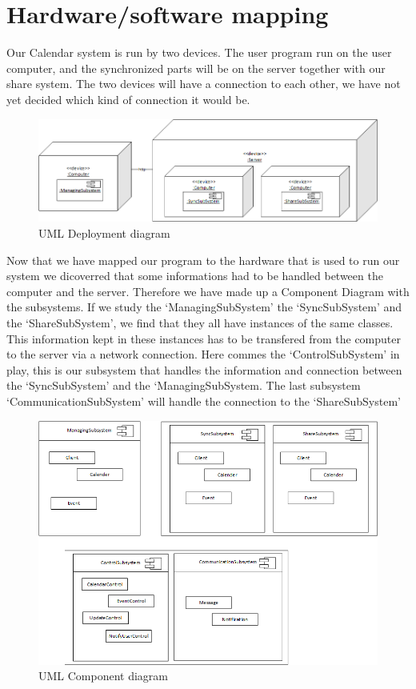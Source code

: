\newpage
\section*{Hardware/software mapping}

Our Calendar system is run by two devices. The user program run on the user computer, and the synchronized parts will be on the server together with our share system. The two devices will have a connection to each other, we have not yet decided which kind of connection it would be.

\begin{figure}[ht!]
\centering
\includegraphics[width=160mm]{UMLDeployment.png}
\caption{UML Deployment diagram \label{overflow}}
\end{figure}

Now that we have mapped our program to the hardware that is used to run our system we dicoverred that some informations had to be handled between the computer and the server. Therefore we have made up a Component Diagram with the subsystems. If we study the ‘ManagingSubSystem’ the ‘SyncSubSystem’ and the ‘ShareSubSystem’, we find that they all have instances of the same classes. This information kept in these instances has to be transfered from the computer to the server via a network connection. Here commes the ‘ControlSubSystem’ in play, this is our subsystem that handles the information and connection between the ‘SyncSubSystem’ and the ‘ManagingSubSystem. The last subsystem ‘CommunicationSubSystem’ will handle the connection to the ‘ShareSubSystem’

\begin{figure}[ht!]
\centering
\includegraphics[width=160mm]{UMLComponent.png}
\caption{UML Component diagram \label{overflow}}
\end{figure}



